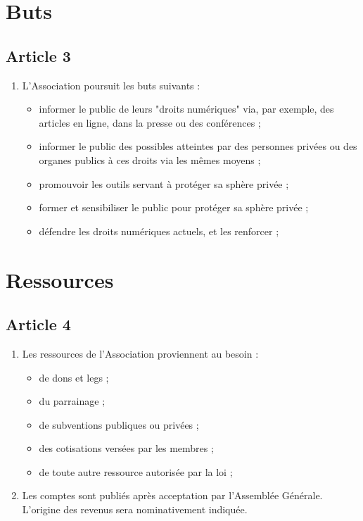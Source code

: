 \documentclass[12pt,twoside]{report}
\begin{document}
\section*{Buts}

\subsection*{Article 3}
\begin{enumerate}
\item L’Association poursuit les buts suivants :
\begin{itemize}
\item informer le public de leurs "droits numériques" via, par exemple, des articles en ligne, dans la presse ou des conférences ;
\item informer le public des possibles atteintes par des personnes privées ou des organes publics à ces droits via les mêmes moyens ;
\item promouvoir les outils servant à protéger sa sphère privée ;
\item former et sensibiliser le public pour protéger sa sphère privée ;
\item défendre les droits numériques actuels, et les renforcer ;
\end{itemize}
\end{enumerate}

\section*{Ressources}

\subsection*{Article 4}
\begin{enumerate}
\item Les ressources de l’Association proviennent au besoin :
\begin{itemize}
\item de dons et legs ;
\item du parrainage ;
\item de subventions publiques ou privées ;
\item des cotisations versées par les membres ;
\item de toute autre ressource autorisée par la loi ;
\end{itemize}

\item Les comptes sont publiés après acceptation par l’Assemblée Générale. L’origine des revenus sera nominativement indiquée.
\end{enumerate}
\end{document}
